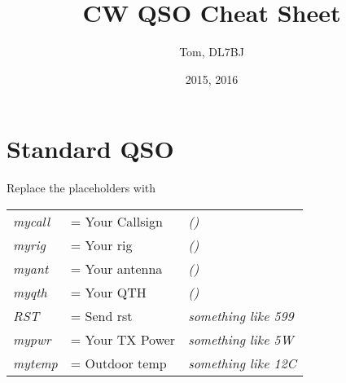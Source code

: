 \documentclass[10pt]{article}
\title{CW QSO Cheat Sheet}
\author{Tom, DL7BJ}
\date{2015, 2016}
\renewcommand{\maketitle}{%
{\begin{center}\Large \mythetitle\end{center}}

}
\begin{document}
\begin{multicols}{3}
\maketitle

\section{Standard QSO}
\vspace{\baselineskip}

Replace the placeholders with\\
\begin{tabular}{lll}
\textit{mycall} & = Your Callsign & \textit{(\hspace{3cm})}\\
\textit{myrig} & = Your rig & \textit{(\hspace{3cm})}\\
\textit{myant} & = Your antenna & \textit{(\hspace{3cm})}\\
\textit{myqth} & = Your QTH & \textit{(\hspace{3cm})}\\
\textit{RST} & = Send rst & \textit{something like 599}\\
\textit{mypwr} & = Your TX Power & \textit{something like 5W}\\
\textit{mytemp} & = Outdoor temp & \textit{something like 12C}\\
\end{tabular}
\vspace{\baselineskip}



\end{multicols}
\end{document}
